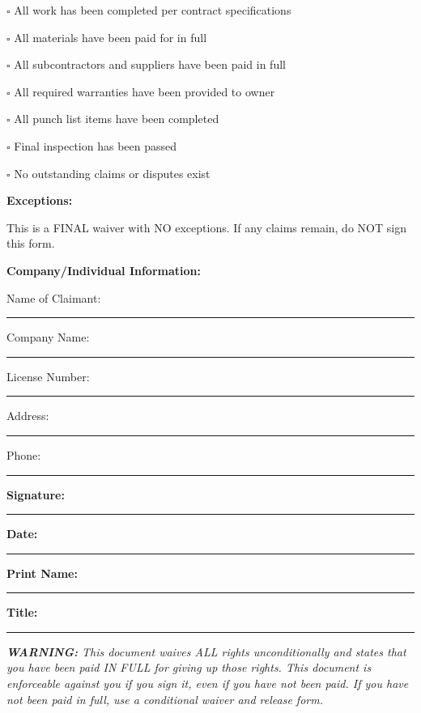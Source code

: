 \documentclass[11pt,letterpaper]{article}
\begin{document}
$\square$ All work has been completed per contract specifications

$\square$ All materials have been paid for in full

$\square$ All subcontractors and suppliers have been paid in full

$\square$ All required warranties have been provided to owner

$\square$ All punch list items have been completed

$\square$ Final inspection has been passed

$\square$ No outstanding claims or disputes exist

\vspace{6pt}

\textbf{Exceptions:}

This is a FINAL waiver with NO exceptions. If any claims remain, do NOT sign this form.

\vspace{12pt}

\textbf{Company/Individual Information:}

Name of Claimant: \rule{8cm}{0.4pt}

Company Name: \rule{8cm}{0.4pt}

License Number: \rule{5cm}{0.4pt}

Address: \rule{10cm}{0.4pt}

Phone: \rule{4cm}{0.4pt}

\vspace{12pt}

\textbf{Signature:} \rule{6cm}{0.4pt} \textbf{Date:} \rule{3cm}{0.4pt}

\textbf{Print Name:} \rule{6cm}{0.4pt}

\textbf{Title:} \rule{6cm}{0.4pt}

\vspace{6pt}

\textit{\textbf{WARNING:} This document waives ALL rights unconditionally and states that you have been paid IN FULL for giving up those rights. This document is enforceable against you if you sign it, even if you have not been paid. If you have not been paid in full, use a conditional waiver and release form.}
\end{document}
